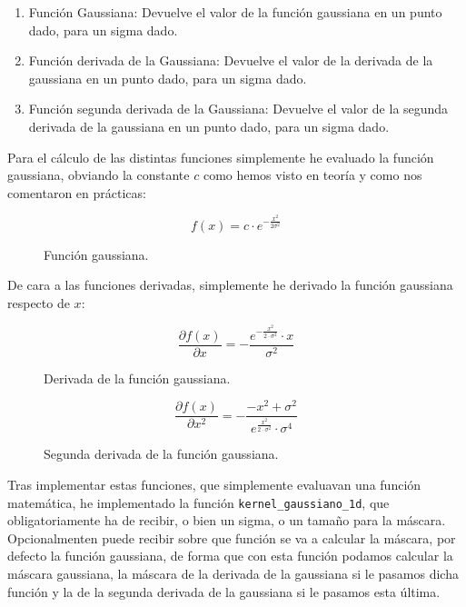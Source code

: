 \documentclass[12pt, spanish]{article}
\begin{document}
\begin{enumerate}
	\item Función Gaussiana: Devuelve el valor de la función gaussiana en un punto dado, para un sigma dado.
	\item Función derivada de la Gaussiana: Devuelve el valor de la derivada de la gaussiana en un punto dado, para un sigma dado.
	\item Función segunda derivada de la Gaussiana: Devuelve el valor de la segunda derivada de la gaussiana en un punto dado, para un sigma dado.
\end{enumerate}


Para el cálculo de las distintas funciones simplemente he evaluado la función gaussiana, obviando la constante $c$ como hemos visto en teoría y como nos comentaron en prácticas:

\begin{figure}[H]
	\centering
	\[ f(x) = c \cdot e^{- \frac{x^2}{2\sigma^2}} \]
	\caption{Función gaussiana.}
	\label{f_gaussiana}
\end{figure}

\newpage

De cara a las funciones derivadas, simplemente he derivado la función gaussiana respecto de $x$:


\begin{figure}[H]
	\centering
	\[ \frac{\partial{f(x)}}{\partial{x}} = -\frac{e^{ -\frac{x^2}{2 \cdot \sigma^2} } \cdot x}{\sigma^2} \]
	\caption{Derivada de la función gaussiana.}
	\label{d_f_gaussiana}
\end{figure}

\begin{figure}[H]
	\centering
	\[ \frac{\partial{f(x)}}{\partial{x^2}} = -\frac{- x^2 + \sigma^2}{e^{ \frac{x^2}{2 \cdot \sigma^2} } \cdot \sigma^4} \]
	\caption{Segunda derivada de la función gaussiana.}
	\label{2d_f_gaussiana}
\end{figure}


Tras implementar estas funciones, que simplemente evaluavan una función matemática, he implementado la función \texttt{kernel\_gaussiano\_1d}, que obligatoriamente ha de recibir, o bien un sigma, o un tamaño para la máscara. Opcionalmenten puede recibir sobre que función se va a calcular la máscara, por defecto la función gaussiana, de forma que con esta función podamos calcular la máscara gaussiana, la máscara de la derivada de la gaussiana si le pasamos dicha función y la de la segunda derivada de la gaussiana si le pasamos esta última.
\end{document}
